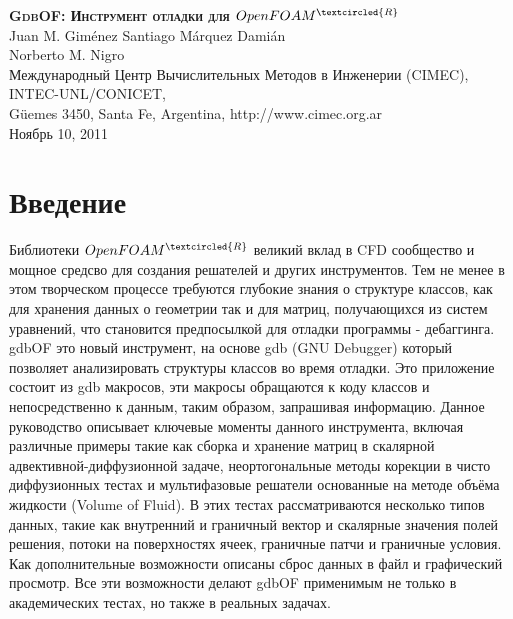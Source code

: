 \documentclass[a4paper,10pt]{book}
\begin{document}
\begin{titlepage} %
\newpage\vspace*{\fill}




\begin{center}

\textsc{\textbf{\Large GdbOF: Инструмент отладки для $OpenFOAM^{\tiny\textcircled{R}}$}} \\
\vspace{2.5em}
Juan M. Gim\'enez\hspace{6em} Santiago M\'arquez Dami\'an \\
Norberto M. Nigro \\
\small Международный Центр Вычислительных Методов в Инженерии (CIMEC), \\
INTEC-UNL/CONICET, \\
G\"uemes 3450, Santa Fe, Argentina, http://www.cimec.org.ar\\
Ноябрь 10, 2011\\


\end{center}

\vspace*{\fill}\newpage


\end{titlepage}


\tableofcontents %


\chapter*{Введение}


Библиотеки $OpenFOAM^{\tiny\textcircled{R}}$ великий вклад в CFD сообщество и мощное средсво для создания
решателей и других инструментов. Тем не менее в этом творческом процессе требуются глубокие знания о структуре классов,
как для хранения данных о геометрии так и для матриц, получающихся из систем уравнений, что становится предпосылкой для
отладки программы - дебаггинга. \\
gdbOF это новый инструмент, на основе gdb (GNU Debugger) который позволяет анализировать структуры классов во время
отладки. Это приложение состоит из gdb макросов, эти макросы обращаются к коду классов и непосредственно к данным, таким образом,
запрашивая информацию. Данное руководство описывает ключевые моменты данного инструмента, включая различные примеры такие как
сборка и хранение матриц в скалярной адвективной-диффузионной задаче, неортогональные методы корекции в чисто диффузионных тестах и
мультифазовые решатели основанные на методе объёма жидкости (Volume of Fluid). В этих тестах рассматриваются несколько типов
данных, такие как внутренний и граничный вектор и скалярные значения полей решения, потоки на поверхностях ячеек, граничные патчи
и граничные условия. Как дополнительные возможности описаны сброс данных в файл и графический просмотр. \linebreak
Все эти возможности делают gdbOF применимым не только в академических тестах, но также в реальных задачах.
\end{document}
